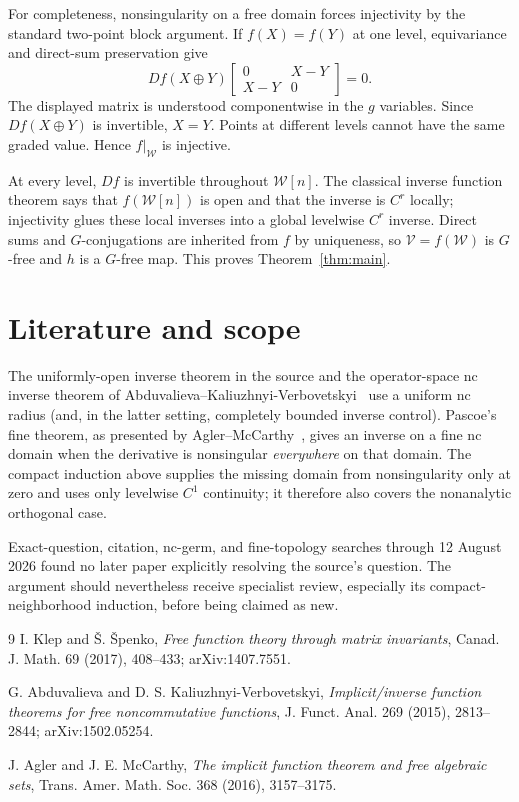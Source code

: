 \documentclass[11pt]{article}
\newcommand{\W}{\mathcal W}
\newcommand{\V}{\mathcal V}
\newcommand{\op}{\mathbin{\oplus}}
\begin{document}
For completeness, nonsingularity on a free domain forces injectivity by the
standard two-point block argument.  If $f(X)=f(Y)$ at one level, equivariance
and direct-sum preservation give
\[
 Df(X\op Y)
 \begin{bmatrix}0&X-Y\\X-Y&0\end{bmatrix}=0.
\]
The displayed matrix is understood componentwise in the $g$ variables.  Since
$Df(X\op Y)$ is invertible, $X=Y$.  Points at different levels cannot have the
same graded value.  Hence $f|_{\W}$ is injective.

At every level, $Df$ is invertible throughout $\W[n]$.  The classical inverse
function theorem says that $f(\W[n])$ is open and that the inverse is $C^r$
locally; injectivity glues these local inverses into a global levelwise
$C^r$ inverse.  Direct sums and $G$-conjugations are inherited from $f$ by
uniqueness, so $\V=f(\W)$ is $G$-free and $h$ is a $G$-free map.  This proves
Theorem~\ref{thm:main}.

\section{Literature and scope}

The uniformly-open inverse theorem in the source and the operator-space nc
inverse theorem of Abduvalieva--Kaliuzhnyi-Verbovetskyi~\cite{akv} use a
uniform nc radius (and, in the latter setting, completely bounded inverse
control).  Pascoe's fine theorem, as presented by Agler--McCarthy~\cite{am},
gives an inverse on a fine nc domain when the derivative is nonsingular
\emph{everywhere} on that domain.  The compact induction above supplies the
missing domain from nonsingularity only at zero and uses only levelwise
$C^1$ continuity; it therefore also covers the nonanalytic orthogonal case.

Exact-question, citation, nc-germ, and fine-topology searches through
12 August 2026 found no later paper explicitly resolving the source's
question.  The argument should nevertheless receive specialist review,
especially its compact-neighborhood induction, before being claimed as new.

\begin{thebibliography}{9}
I. Klep and \v S. \v Spenko,
\emph{Free function theory through matrix invariants},
Canad. J. Math. 69 (2017), 408--433; arXiv:1407.7551.

G. Abduvalieva and D. S. Kaliuzhnyi-Verbovetskyi,
\emph{Implicit/inverse function theorems for free noncommutative functions},
J. Funct. Anal. 269 (2015), 2813--2844; arXiv:1502.05254.

J. Agler and J. E. McCarthy,
\emph{The implicit function theorem and free algebraic sets},
Trans. Amer. Math. Soc. 368 (2016), 3157--3175.
\end{thebibliography}
\end{document}
